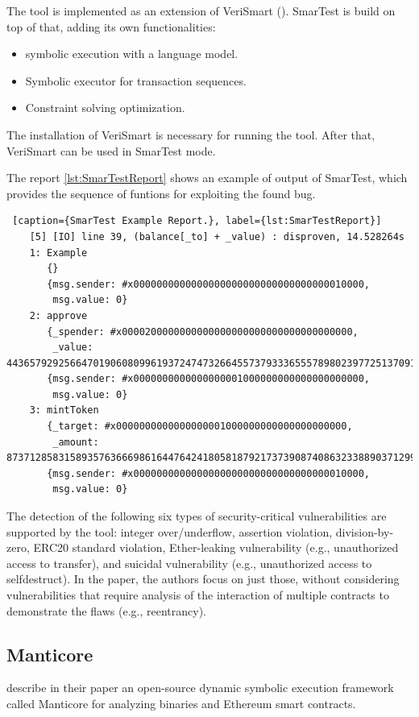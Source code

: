 The tool is implemented as an extension of VeriSmart (\citet{VeriSmart}).
SmarTest is build on top of that, adding its own functionalities:
\begin{itemize}
    \item symbolic execution with a language model.
    \item Symbolic executor for transaction sequences.
    \item Constraint solving optimization.
\end{itemize}
The installation of VeriSmart is necessary for running the tool. After that, VeriSmart can be used in SmarTest mode.

The report \autoref{lst:SmarTestReport} shows an example of output of SmarTest, which provides the sequence of funtions for exploiting the found bug.
\begin{lstlisting} [caption={SmarTest Example Report.}, label={lst:SmarTestReport}]
    [5] [IO] line 39, (balance[_to] + _value) : disproven, 14.528264s
    1: Example
       {}
       {msg.sender: #x0000000000000000000000000000000000010000,
        msg.value: 0}
    2: approve
       {_spender: #x0000200000000000000000000000000000000000,
        _value: 44365792925664701906080996193724747326645573793336555789802397725137091694592}
       {msg.sender: #x0000000000000000001000000000000000000000,
        msg.value: 0}
    3: mintToken
       {_target: #x0000000000000000001000000000000000000000,
        _amount: 87371285831589357636669861644764241805818792173739087408632338890371299803136}
       {msg.sender: #x0000000000000000000000000000000000010000,
        msg.value: 0}
\end{lstlisting}

The detection of  the following six types of security-critical vulnerabilities are supported by the tool: integer over/underflow, 
assertion violation, division-by-zero, 
ERC20 standard violation, Ether-leaking vulnerability (e.g., 
unauthorized access to transfer), and suicidal vulnerability 
(e.g., unauthorized access to selfdestruct).
In the paper, the authors  focus on just those, without considering vulnerabilities that require analysis of
the interaction of multiple contracts to demonstrate the flaws 
(e.g., reentrancy).

\subsection{Manticore}
\label{sec:Specification:Manticore}
\citet{ManticorePaper} describe in their paper an open-source dynamic
symbolic execution framework called Manticore for analyzing
binaries and Ethereum smart contracts.

